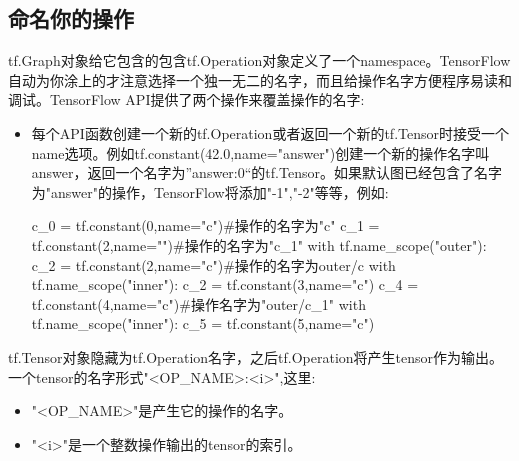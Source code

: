 \subsection{命名你的操作}
tf.Graph对象给它包含的包含tf.Operation对象定义了一个namespace。TensorFlow自动为你涂上的才注意选择一个独一无二的名字，而且给操作名字方便程序易读和调试。TensorFlow API提供了两个操作来覆盖操作的名字:
\begin{itemize}
\item 每个API函数创建一个新的tf.Operation或者返回一个新的tf.Tensor时接受一个name选项。例如tf.constant(42.0,name="answer")创建一个新的操作名字叫answer，返回一个名字为”answer:0“的tf.Tensor。如果默认图已经包含了名字为"answer"的操作，TensorFlow将添加"-1","-2"等等，例如:
\begin{python}
c_0 = tf.constant(0,name="c")#操作的名字为"c"
c_1 = tf.constant(2,name="")#操作的名字为"c_1"
with tf.name_scope("outer"):
    c_2 = tf.constant(2,name="c")#操作的名字为outer/c
    with tf.name_scope("inner"):
        c_2 = tf.constant(3,name="c")
    c_4 = tf.constant(4,name="c")#操作名字为"outer/c_1"
    with tf.name_scope("inner"):
        c_5 = tf.constant(5,name="c")
\end{python}
\end{itemize}
tf.Tensor对象隐藏为tf.Operation名字，之后tf.Operation将产生tensor作为输出。一个tensor的名字形式"<OP\_NAME>:<i>",这里:
\begin{itemize}
\item "<OP\_NAME>"是产生它的操作的名字。
\item "<i>"是一个整数操作输出的tensor的索引。
\end{itemize}
